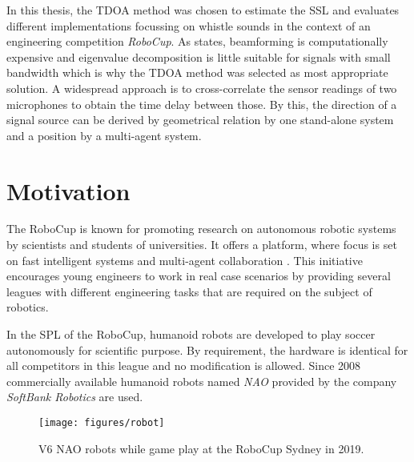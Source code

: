 In this thesis, the \ac{TDOA} method was chosen to estimate the \ac{SSL} and evaluates
different implementations focussing on whistle sounds in the context of an engineering competition
\textit{\ac{RoboCup}}.
As \cite{BAS_estimator} states, beamforming is computationally expensive and eigenvalue
decomposition is little suitable
for signals with small bandwidth which is why the \ac{TDOA} method was selected as most
appropriate solution.
A widespread approach is to cross-correlate the sensor readings of two microphones
to obtain the time delay between those.
By this, the direction of a signal source can be derived by geometrical relation by one
stand-alone system and a position by a multi-agent system.

\section{Motivation}

The \acf{RoboCup} is known for promoting research on autonomous robotic systems
by scientists and students of universities.
It offers a platform, where focus is set on fast intelligent systems and multi-agent
collaboration \cite{robocup}.
This initiative encourages young engineers to work in real case scenarios
by providing several leagues with different engineering tasks that are required
on the subject of robotics.

In the \ac{SPL} of the \ac{RoboCup}, humanoid robots are developed to play soccer autonomously
for scientific purpose.
By requirement, the hardware is identical for all competitors in this league and no modification
is allowed.
Since 2008 commercially available humanoid robots named \textit{NAO} provided by the
company \textit{SoftBank Robotics} are used.
\begin{figure}[ht]
	\centering
        \texttt{[image: figures/robot]}
	\caption[NAO robot]{V6 NAO robots while game play at the \ac{RoboCup} Sydney in 2019.}
	\label{fig:01_robot}
\end{figure}

